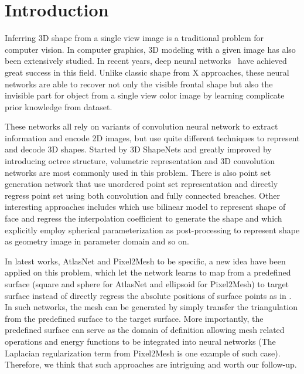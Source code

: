 \section{Introduction}
Inferring 3D shape from a single view image is a traditional problem for computer vision. In computer graphics, 3D modeling with a given image has also been extensively studied.  In recent years, deep neural networks~\cite{3DR2N2,PSGN}  have achieved great success in this field. Unlike classic shape from X  approaches, these neural networks are able to recover not only the visible frontal shape but also the invisible part for object from a single view color image by learning complicate prior knowledge from dataset. 

These networks all rely on variants of convolution neural network to extract information and encode 2D images, but use quite different techniques to represent and decode 3D shapes. Started by 3D ShapeNets\cite{3dshapenet} and greatly improved by introducing octree structure\cite{octreegen}, volumetric representation and 3D convolution networks are most commonly used in this problem. There is also point set generation network\cite{PSGN} that use unordered point set representation and directly regress point set using both convolution and fully connected breaches. Other interesting approaches includes \cite{endface} which use bilinear model to represent shape of face and regress the interpolation coefficient to generate the shape and \cite{surfnet} which explicitly employ spherical parameterization as post-processing to represent shape as geometry image in parameter domain and so on.

In latest works, AtlasNet\cite{atlasnet} and Pixel2Mesh\cite{pixel2mesh} to be specific, a new idea have been applied on this problem, which let the network learns to map from a predefined surface (square and sphere for AtlasNet and ellipsoid for Pixel2Mesh) to target surface instead of directly regress the absolute positions of surface points as in \cite{PSGN}. In such networks, the mesh can be generated by simply transfer the triangulation from the predefined surface to the target surface. More importantly, the predefined surface can serve as the domain of definition allowing mesh related operations and energy functions to be integrated into neural networks (The Laplacian regularization term from Pixel2Mesh is one example of such case). Therefore, we think that such approaches are intriguing and worth our follow-up.

